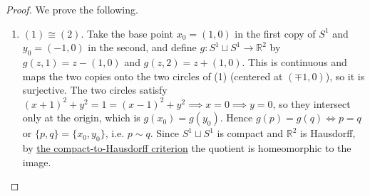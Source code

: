 	\begin{proof}
	  We prove the following. 
		\begin{enumerate}
		  \item $(1) \cong (2)$. Take the base point $x_0 = (1, 0)$ in the first copy of $S^1$ and $y_0 = (-1, 0)$ in the second, and define $g: S^1 \sqcup S^1 \rightarrow \mathbb{R}^2$ by $g(z, 1) = z - (1, 0)$ and $g(z, 2) = z + (1, 0)$. This is continuous and maps the two copies onto the two circles of (1) (centered at $(\mp 1, 0)$), so it is surjective. The two circles satisfy $(x + 1)^2 + y^2 = 1 = (x - 1)^2 + y^2 \implies x = 0 \implies y = 0$, so they intersect only at the origin, which is $g(x_0) = g(y_0)$. Hence $g(p) = g(q) \iff p = q$ or $\{p, q\} = \{x_0, y_0\}$, i.e. $p \sim q$. Since $S^1 \sqcup S^1$ is compact and $\mathbb{R}^2$ is Hausdorff, by \hyperref[thm:compact_hausdorff_quotient]{the compact-to-Hausdorff criterion} the quotient is homeomorphic to the image. 
		\end{enumerate}
	\end{proof}

